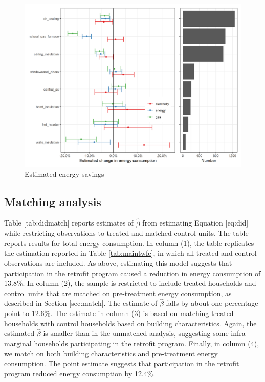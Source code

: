 \documentclass{article}
\begin{document}
\begin{figure}
	\includegraphics[width=\linewidth]{../output_figures_tables/mbm_energy_savings_combined.png}
	\caption{Estimated energy savings}\label{fig:did_mbm}
\end{figure}

\subsection{Matching analysis}
Table \ref{tab:didmatch} reports estimates of $\hat{\beta}$ from estimating Equation \eqref{eq:did} while restricting observations to treated and matched control units. The table reports results for total energy consumption. In column (1), the table replicates the estimation reported in Table \ref{tab:maintwfe}, in which all treated and control observations are included. As above, estimating this model suggests that participation in the retrofit program caused a reduction in energy consumption of 13.8\%. In column (2), the sample is restricted to include treated households and control units that are matched on pre-treatment energy consumption, as described in Section \ref{sec:match}. The estimate of $\hat{\beta}$ falls by about one percentage point to 12.6\%. The estimate in column (3) is based on matching treated households with control households based on building characteristics. Again, the estimated $\hat{\beta}$ is smaller than in the unmatched analysis, suggesting some infra-marginal households participating in the retrofit program. Finally, in column (4), we match on both building characteristics and pre-treatment energy consumption. The point estimate suggests that participation in the retrofit program reduced energy consumption by 12.4\%. 
\end{document}
